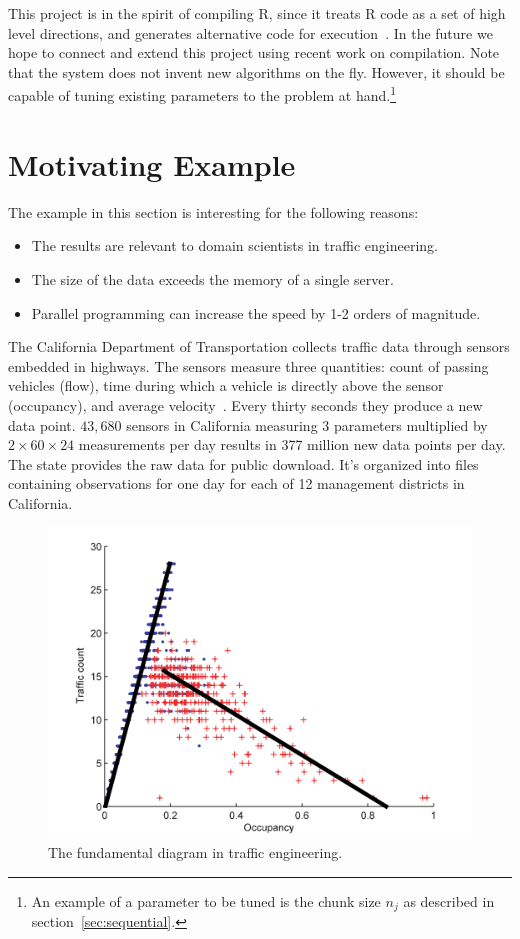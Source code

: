 \documentclass[12pt]{article}
\begin{document}
This project is in the spirit of compiling R, since it treats R code as a
set of high level directions, and generates alternative code for
execution~\cite{lang2014enhancing}. In the future we hope to connect and
extend this project using recent work on compilation. Note that the system
does not invent new algorithms on the fly. However, it should be capable of
tuning existing parameters to the problem at hand.\footnote{An example of a
parameter to be tuned is the chunk size $n_j$ as described in
section~\ref{sec:sequential}.} 

\section{Motivating Example}
\label{sec:pems}

The example in this section is interesting for the following reasons:
\begin{itemize}
    \item The results are relevant to domain scientists in traffic engineering.
    \item The size of the data exceeds the memory of a single server.
    \item Parallel programming can increase the speed by 1-2 orders of
        magnitude.
\end{itemize}

The California Department of Transportation collects traffic data through
sensors embedded in highways. The sensors measure three quantities: count
of passing vehicles (flow), time during which a vehicle is directly above the
sensor (occupancy), and average velocity~\cite{jia2001pems}.  Every thirty
seconds they produce a new data point. $43,680$ sensors in California
measuring 3 parameters multiplied by $2 \times 60 \times 24$ measurements
per day results in 377 million new data points per day. The state provides
the raw data for public download. It's organized into files containing
observations for one day for each of 12 management districts in
California.

\begin{figure}
\centering
\includegraphics[width=.7\linewidth]{seminar/fundamental_diagram}
\caption{The fundamental diagram in traffic engineering.}
\label{fig:fundamental_diagram}
\end{figure}
\end{document}
